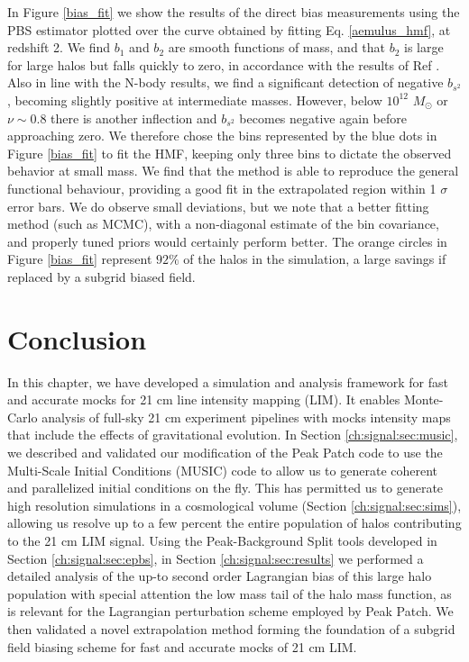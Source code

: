 In Figure \ref{bias_fit} we show the results of the direct bias measurements using the PBS estimator plotted over the curve obtained by fitting Eq. \ref{aemulus_hmf}, at redshift 2. We find $b_1$ and $b_2$ are smooth functions of mass, and that $b_2$ is large for large halos but falls quickly to zero, in accordance with the results of Ref \citep{modietal2017}. Also in line with the N-body results, we find a significant detection of negative $b_{s^2}$, becoming slightly positive at intermediate masses. However, below $10^{12}$ $M_\odot$ or $\nu \sim 0.8$ there is another inflection and $b_{s^2}$ becomes negative again before approaching zero. We therefore chose the bins represented by the blue dots in Figure \ref{bias_fit} to fit the HMF, keeping only three bins to dictate the observed behavior at small mass. We find that the method is able to reproduce the general functional behaviour, providing a good fit in the extrapolated region within 1 $\sigma$ error bars. We do observe small deviations, but we note that a better fitting method (such as MCMC), with a non-diagonal estimate of the bin covariance, and properly tuned priors would certainly perform better. The orange circles in Figure \ref{bias_fit} represent $92\%$ of the halos in the simulation, a large savings if replaced by a subgrid biased field.

\section{Conclusion}
\label{ch:signal:sec:conclusion}

In this chapter, we have developed a simulation and analysis framework for fast and accurate mocks for 21 cm line intensity mapping (LIM). It enables Monte-Carlo analysis of full-sky 21 cm experiment pipelines with mocks intensity maps that include the effects of gravitational evolution. In Section \ref{ch:signal:sec:music}, we described  and validated our modification of the Peak Patch code to use the Multi-Scale Initial Conditions (MUSIC) code \citep{music} to allow us to generate coherent and parallelized initial conditions on the fly. This has permitted us to generate high resolution simulations in a cosmological volume (Section \ref{ch:signal:sec:sims}), allowing us resolve up to a few percent the entire population of halos contributing to the 21 cm LIM signal. Using the Peak-Background Split tools developed in Section \ref{ch:signal:sec:epbs}, in Section \ref{ch:signal:sec:results} we performed a detailed analysis of the up-to second order Lagrangian bias of this large halo population with special attention the low mass tail of the halo mass function, as is relevant for the Lagrangian perturbation scheme employed by Peak Patch. We then validated a novel extrapolation method forming the foundation of a subgrid field biasing scheme for fast and accurate mocks of 21 cm LIM.

